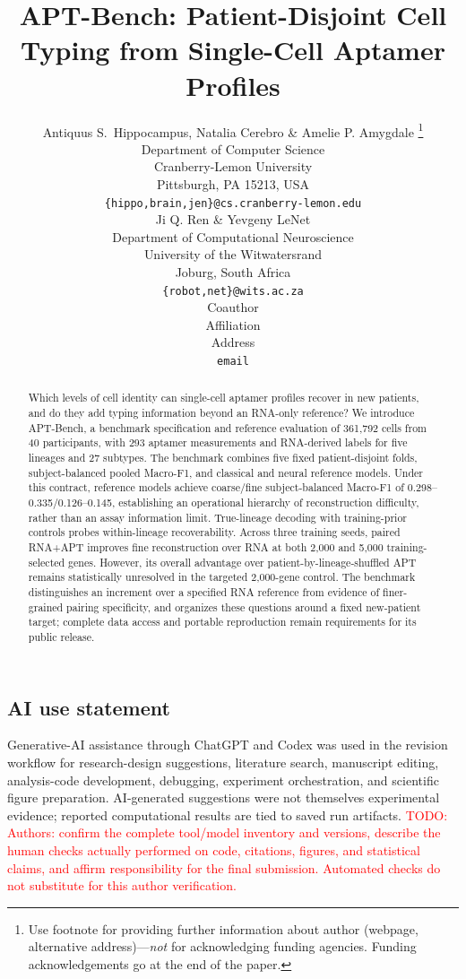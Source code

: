 \documentclass{article} %
\title{APT-Bench: Patient-Disjoint Cell Typing from \mbox{Single-Cell} Aptamer Profiles}
\author{Antiquus S.~Hippocampus, Natalia Cerebro \& Amelie P. Amygdale \thanks{ Use footnote for providing further information
about author (webpage, alternative address)---\emph{not} for acknowledging
funding agencies.  Funding acknowledgements go at the end of the paper.} \\
Department of Computer Science\\
Cranberry-Lemon University\\
Pittsburgh, PA 15213, USA \\
\texttt{\{hippo,brain,jen\}@cs.cranberry-lemon.edu} \\
\And
Ji Q. Ren \& Yevgeny LeNet \\
Department of Computational Neuroscience \\
University of the Witwatersrand \\
Joburg, South Africa \\
\texttt{\{robot,net\}@wits.ac.za} \\
\AND
Coauthor \\
Affiliation \\
Address \\
\texttt{email}
}
\newcommand{\todo}[1]{\textcolor{red}{TODO: #1}}
\begin{document}
\raggedbottom


\maketitle

\begin{abstract}
Which levels of cell identity can single-cell aptamer profiles recover in new
patients, and do they add typing information beyond an RNA-only reference?
We introduce APT-Bench, a benchmark
specification and reference evaluation of 361{,}792 cells from 40 participants,
with 293 aptamer measurements and RNA-derived labels for five lineages and
27 subtypes. The benchmark combines five fixed patient-disjoint folds,
subject-balanced pooled Macro-F1, and classical and neural reference models.
Under this contract, reference models achieve
coarse/fine subject-balanced Macro-F1 of 0.298--0.335/0.126--0.145,
establishing an operational hierarchy of reconstruction difficulty, rather
than an assay information limit. True-lineage decoding with training-prior
controls probes within-lineage recoverability. Across three training seeds,
paired RNA+APT improves fine reconstruction over RNA at both 2{,}000 and
5{,}000 training-selected genes. However, its overall advantage over
patient-by-lineage-shuffled APT remains statistically unresolved in the
targeted 2{,}000-gene control. The benchmark distinguishes an increment over
a specified RNA reference from evidence of finer-grained pairing specificity,
and organizes these questions around a fixed
new-patient target; complete data access and portable reproduction remain
requirements for its public release.
\end{abstract}














\subsection*{AI use statement}

Generative-AI assistance through ChatGPT and Codex was used in the revision
workflow for research-design suggestions, literature search, manuscript editing,
analysis-code development, debugging, experiment orchestration, and scientific
figure preparation. AI-generated suggestions were not themselves experimental
evidence; reported computational results are tied to saved run artifacts.
\todo{Authors: confirm the complete tool/model inventory and versions, describe
the human checks actually performed on code, citations, figures, and statistical
claims, and affirm responsibility for the final submission. Automated checks
do not substitute for this author verification.}
\end{document}
